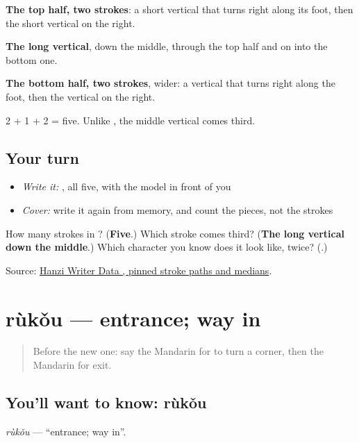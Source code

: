 \begin{quote}
\end{quote}

\textbf{The top half, two strokes}: a short vertical that turns right along its foot, then the short vertical on the right.

\textbf{The long vertical}, down the middle, through the top half and on into the bottom one.

\textbf{The bottom half, two strokes}, wider: a vertical that turns right along the foot, then the vertical on the right.

2 + 1 + 2 = five. Unlike , the middle vertical comes third.

\subsection*{Your turn}
\begin{itemize}
\raggedright
  \item \emph{Write it:} , all five, with the model in front of you
  \item \emph{Cover:} write it again from memory, and count the pieces, not the strokes
\end{itemize}

\begin{tcolorbox}[breakable,colback=teal!4,colframe=teal!35!black,title={Before you move on}]
How many strokes in ? (\textbf{Five}.) Which stroke comes third? (\textbf{The long vertical down the middle}.) Which character you know does it look like, twice? (\textbf{}.)

Source: \href{https://raw.githubusercontent.com/chanind/hanzi-writer-data/68d10a4b21150cae5e1ebbd223eed289cf32d90c/data/\%E5\%87\%BA.json}{Hanzi Writer Data , pinned stroke paths and medians}.
\end{tcolorbox}
\section[rùkǒu]{rùkǒu — entrance; way in}

\label{lesson:ZH-C112-rukou}



\begin{quote}
Before the new one: say the Mandarin for to turn a corner, then the Mandarin for exit.
\end{quote}

\subsection*{You'll want to know: rùkǒu}
\emph{rùkǒu} — \textquotedblleft{}entrance; way in\textquotedblright{}.

